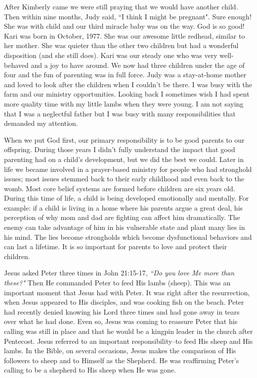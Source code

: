 \documentclass[oneside,12pt]{book}
\begin{document}
After Kimberly came we were still praying that we would have another child. Then within nine months, Judy said, ``I think I might be pregnant". Sure enough! She was with child and our third miracle baby was on the way. God is so good! Kari was born in October, 1977. She was our awesome little redhead, similar to her mother. She was quieter than the other two children but had a wonderful disposition (and she still does). Kari was our steady one who was very well-behaved and a joy to have around. We now had three children under the age of four and the fun of parenting was in full force. Judy was a stay-at-home mother and loved to look after the children when I couldn't be there. I was busy with the farm and our ministry opportunities. Looking back I sometimes wish I had spent more quality time with my little lambs when they were young. I am not saying that I was a neglectful father but I was busy with many responsibilities that demanded my attention.

When we put God first, our primary responsibility is to be good parents to our offspring. During those years I didn't fully understand the impact that good parenting had on a child's development, but we did the best we could. Later in life we became involved in a prayer-based ministry for people who had stronghold issues; most issues stemmed back to their early childhood and even back to the womb. Most core belief systems are formed before children are six years old. During this time of life, a child is being developed emotionally and mentally. For example: if a child is living in a home where his parents argue a great deal, his perception of why mom and dad are fighting can affect him dramatically. The enemy can take advantage of him in his vulnerable state and plant many lies in his mind. The lies become strongholds which become dysfunctional behaviors and can last a lifetime. It is so important for parents to love and protect their children.

Jesus asked Peter three times in John 21:15-17, \textit{``Do you love Me more than these?"} Then He commanded Peter to feed His lambs (sheep). This was an important moment that Jesus had with Peter. It was right after the resurrection, when Jesus appeared to His disciples, and was cooking fish on the beach. Peter had recently denied knowing his Lord three times and had gone away in tears over what he had done. Even so, Jesus was coming to reassure Peter that his calling was still in place and that he would be a kingpin leader in the church after Pentecost. Jesus referred to an important responsibility--to feed His sheep and His lambs. In the Bible, on several occasions, Jesus makes the comparison of His followers to sheep and to Himself as the Shepherd. He was reaffirming Peter's calling to be a shepherd to His sheep when He was gone.
\end{document}
